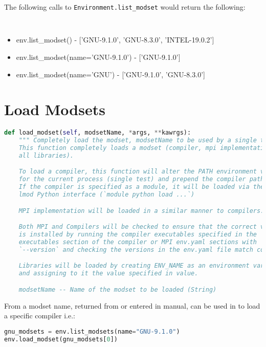 The following calls to {\tt Environment.list\_modset} would return the
following:

{\tt
\begin{itemize}
\item env.list\_modset() - ['GNU-9.1.0', 'GNU-8.3.0', 'INTEL-19.0.2']
\item env.list\_modset(name='GNU-9.1.0') - ['GNU-9.1.0']
\item env.list\_modset(name='GNU') - ['GNU-9.1.0', 'GNU-8.3.0']
\end{itemize}
}


\section{Load Modsets}
\label{sec:load-modsets}

\begin{lstlisting}[language=Python, 
                   caption={load\_modset Definition},
                   label=load_modset_def]
def load_modset(self, modsetName, *args, **kawrgs):
    """ Completely load the modset, modsetName to be used by a single test.
    This function completely loads a modset (compiler, mpi implementation, and
    all libraries).

    To load a compiler, this function will alter the PATH environment variable
    for the current process (single test) and prepend the compiler path to it.
    If the compiler is specified as a module, it will be loaded via the
    lmod Python interface (`module python load ...`)

    MPI implementation will be loaded in a similar manner to compilers.

    Both MPI and Compilers will be checked to ensure that the correct version
    is installed by running the compiler executables specified in the
    executables section of the compiler or MPI env.yaml sections with
    `--version` and checking the versions in the env.yaml file match correctly.

    Libraries will be loaded by creating ENV_NAME as an environment variable
    and assigning to it the value specified in value.

    modsetName -- Name of the modset to be loaded (String)
\end{lstlisting}

From a modset name, returned from \listModsets or entered in manual, can be
used in \loadModset to load a specific compiler i.e.:

\begin{lstlisting}[language=Python]
gnu_modsets = env.list_modsets(name="GNU-9.1.0")
env.load_modset(gnu_modsets[0])
\end{lstlisting}

